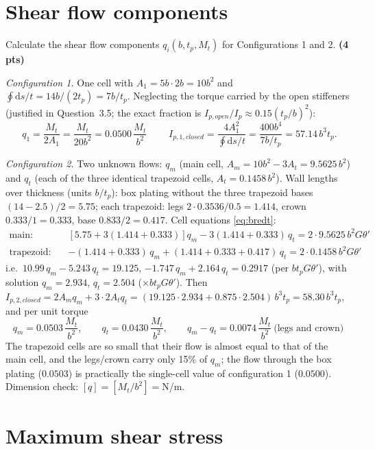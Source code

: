 \section{Shear flow components}

Calculate the shear flow components $q_i(b,t_p,M_t)$ for Configurations 1 and 2. \textbf{(4 pts)}

\bigskip
\emph{Configuration 1.} One cell with $A_1=5b\cdot2b=10b^2$ and $\oint\mathrm{d}s/t=14b/(2t_p)=7b/t_p$. Neglecting the torque carried by the open stiffeners (justified in Question~3.5; the exact fraction is $I_{p,open}/I_p\approx0.15(t_p/b)^2$):
\begin{equation}
  \boxed{\;q_1=\frac{M_t}{2A_1}=\frac{M_t}{20b^2}=0.0500\,\frac{M_t}{b^2}\;}\qquad
  I_{p,1,closed}=\frac{4A_1^2}{\oint\mathrm{d}s/t}=\frac{400b^4}{7b/t_p}=57.14\,b^3t_p .
\end{equation}

\emph{Configuration 2.} Two unknown flows: $q_m$ (main cell, $A_m=10b^2-3A_t=9.5625\,b^2$) and $q_t$ (each of the three identical trapezoid cells, $A_t=0.1458\,b^2$). Wall lengths over thickness (units $b/t_p$): box plating without the three trapezoid bases $(14-2.5)/2=5.75$; each trapezoid: legs $2\cdot0.3536/0.5=1.414$, crown $0.333/1=0.333$, base $0.833/2=0.417$. Cell equations \eqref{eq:bredt}:
\begin{align}
  \text{main:}\quad & \left[5.75+3(1.414+0.333)\right]q_m-3(1.414+0.333)\,q_t = 2\cdot9.5625\,b^2G\theta' \nonumber\\
  \text{trapezoid:}\quad & -(1.414+0.333)\,q_m+(1.414+0.333+0.417)\,q_t = 2\cdot0.1458\,b^2G\theta'
\end{align}
i.e.\ $10.99\,q_m-5.243\,q_t=19.125$, $-1.747\,q_m+2.164\,q_t=0.2917$ (per $bt_pG\theta'$), with solution $q_m=2.934$, $q_t=2.504$ ($\times bt_pG\theta'$). Then $I_{p,2,closed}=2A_mq_m+3\cdot2A_tq_t=(19.125\cdot2.934+0.875\cdot2.504)\,b^3t_p=58.30\,b^3t_p$, and per unit torque
\begin{equation}
  \boxed{\;q_m=0.0503\,\frac{M_t}{b^2},\qquad q_t=0.0430\,\frac{M_t}{b^2},\qquad q_m-q_t=0.0074\,\frac{M_t}{b^2}\ \text{(legs and crown)}\;}
\end{equation}
The trapezoid cells are so small that their flow is almost equal to that of the main cell, and the legs/crown carry only 15\% of $q_m$; the flow through the box plating ($0.0503$) is practically the single-cell value of configuration 1 ($0.0500$). Dimension check: $[q]=[M_t/b^2]=$N/m.

\section{Maximum shear stress}

